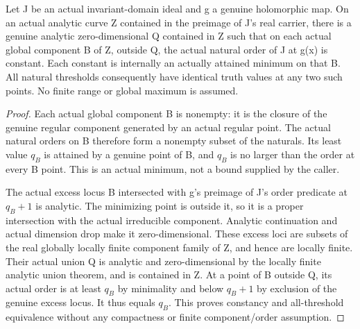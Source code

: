 \begin{lemma}
\label{hir:member-lower-order-component-minimum-exception}
\leanok
Let J be an actual invariant-domain ideal and g a genuine holomorphic map.
On an actual analytic curve Z contained in the preimage of J's real carrier,
there is a genuine analytic zero-dimensional Q contained in Z such that on
each actual global component B of Z, outside Q, the actual natural order
of J at g(x) is constant. Each constant is internally an actually attained
minimum on that B. All natural thresholds consequently have identical truth
values at any two such points. No finite range or global maximum is assumed.
\end{lemma}
\begin{proof}
Each actual global component B is nonempty: it is the closure of the genuine
regular component generated by an actual regular point. The actual natural
orders on B therefore form a nonempty subset of the naturals. Its least value
$q_B$ is attained by a genuine point of B, and $q_B$ is no larger than the order
at every B point. This is an actual minimum, not a bound supplied by the caller.

The actual excess locus B intersected with g's preimage of J's order predicate
at $q_B+1$ is analytic. The minimizing point is outside it, so it is a proper
intersection with the actual irreducible component. Analytic continuation and
actual dimension drop make it zero-dimensional. These excess loci are subsets
of the real globally locally finite component family of Z, and hence are
locally finite. Their actual union Q is analytic and zero-dimensional by the
locally finite analytic union theorem, and is contained in Z. At a point of
B outside Q, its actual order is at least $q_B$ by minimality and below $q_B+1$
by exclusion of the genuine excess locus. It thus equals $q_B$. This proves
constancy and all-threshold equivalence without any compactness or finite
component/order assumption.
\end{proof}

